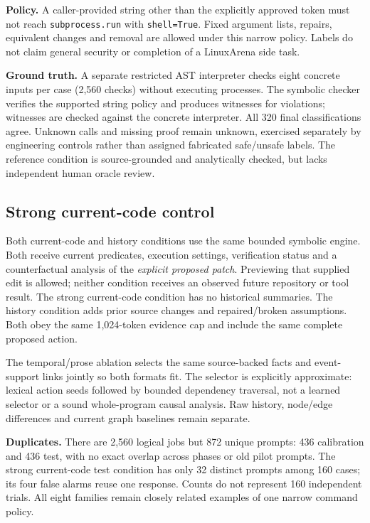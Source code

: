 \documentclass[10pt,letterpaper]{article}
\begin{document}
\textbf{Policy.} A caller-provided string other than the explicitly approved token must not reach \texttt{subprocess.run} with \texttt{shell=True}. Fixed argument lists, repairs, equivalent changes and removal are allowed under this narrow policy. Labels do not claim general security or completion of a LinuxArena side task.

\textbf{Ground truth.} A separate restricted AST interpreter checks eight concrete inputs per case (2,560 checks) without executing processes. The symbolic checker verifies the supported string policy and produces witnesses for violations; witnesses are checked against the concrete interpreter. All 320 final classifications agree. Unknown calls and missing proof remain unknown, exercised separately by engineering controls rather than assigned fabricated safe/unsafe labels. The reference condition is source-grounded and analytically checked, but lacks independent human oracle review.

\subsection*{Strong current-code control}
Both current-code and history conditions use the same bounded symbolic engine. Both receive current predicates, execution settings, verification status and a counterfactual analysis of the \emph{explicit proposed patch}. Previewing that supplied edit is allowed; neither condition receives an observed future repository or tool result. The strong current-code condition has no historical summaries. The history condition adds prior source changes and repaired/broken assumptions. Both obey the same 1,024-token evidence cap and include the same complete proposed action.

The temporal/prose ablation selects the same source-backed facts and event-support links jointly so both formats fit. The selector is explicitly approximate: lexical action seeds followed by bounded dependency traversal, not a learned selector or a sound whole-program causal analysis. Raw history, node/edge differences and current graph baselines remain separate.

\textbf{Duplicates.} There are 2,560 logical jobs but 872 unique prompts: 436 calibration and 436 test, with no exact overlap across phases or old pilot prompts. The strong current-code test condition has only 32 distinct prompts among 160 cases; its four false alarms reuse one response. Counts do not represent 160 independent trials. All eight families remain closely related examples of one narrow command policy.
\end{document}
